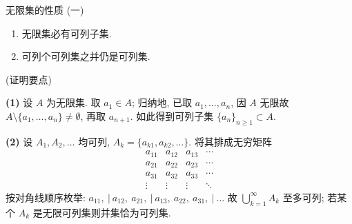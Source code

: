 
\begin{frame}{无限集的性质 (一)}

\begin{thm}
\begin{enumerate}
\item 无限集必有\alert{可列子集}.
\item 可列个可列集之\alert{并}仍是可列集.
\end{enumerate}
\end{thm}

\pause
\vspace{0.3em}

\startproof[bg=yellow, fg=red](证明要点)
\vspace{0.3em}

\textbf{(1)} 设 $A$ 为无限集. 取 $a_1 \in A$; 归纳地, 已取 $a_1, \ldots, a_n$, 因 $A$ 无限故 $A \setminus \{a_1, \ldots, a_n\} \neq \emptyset$, 再取 $a_{n+1}$. 如此得到可列子集 $\{a_n\}_{n \geqslant 1} \subset A$.

\pause
\vspace{0.5em}

\textbf{(2)} 设 $A_1, A_2, \ldots$ 均可列, $A_k = \{a_{k1}, a_{k2}, \ldots\}$. 将其排成无穷矩阵
\[
\begin{matrix}
a_{11} & a_{12} & a_{13} & \cdots \\
a_{21} & a_{22} & a_{23} & \cdots \\
a_{31} & a_{32} & a_{33} & \cdots \\
\vdots & \vdots & \vdots & \ddots
\end{matrix}
\]
按\alert{对角线顺序}枚举: \quad $a_{11}, ~ | ~ a_{12},\ a_{21}, ~ | ~ a_{13},\ a_{22},\ a_{31}, ~ | ~\ldots$
\newline
故 $\bigcup_{k=1}^\infty A_k$ 至多可列; 若某个 $A_k$ 是无限可列集则并集恰为可列集.

\end{frame}



